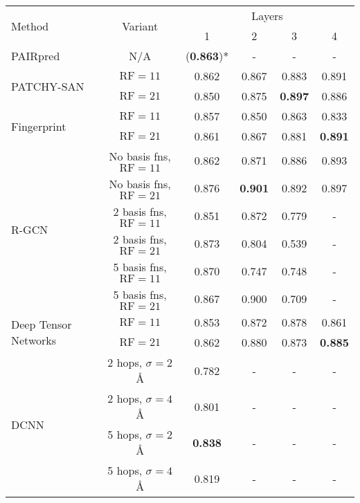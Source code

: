 \begin{table}
	\begin{center}
		\begin{tabular}{l c c c c c }
			\toprule
			
			\multirow{2}{*}{Method} & \multirow{2}{*}{Variant} &  \multicolumn{4}{c}{Layers} \\
											 & & 1 & 2 & 3 & 4 \\
			\midrule
			PAIRpred~\cite{minhas2014}   & N/A  & (\textbf{0.863})* & - & - & - \\

			\midrule
			\multirow{2}{*}{PATCHY-SAN~\cite{niepert2016}}  & $\text{RF}=11$ & 0.862 & 0.867 & 0.883 & 0.891 \\
										 & $\text{RF}=21$ & 0.850 & 0.875 & \textbf{0.897} & 0.886 \\
			\midrule
			\multirow{2}{*}{Fingerprint~\cite{duvenaud2015}}  & $\text{RF}=11$ & 0.857 & 0.850 & 0.863 & 0.833 \\
										  & $\text{RF}=21$ & 0.861 & 0.867 & 0.881 & \textbf{0.891} \\
			\midrule

			\multirow{6}{*}{R-GCN~\cite{schlichtkrull2017}} & No basis fns, $\text{RF}=11$ & 0.862 & 0.871 & 0.886 & 0.893 \\
								   & No basis fns, $\text{RF}=21$ & 0.876 & \textbf{0.901} & 0.892 & 0.897 \\
								   & 2 basis fns, $\text{RF}=11$ & 0.851 & 0.872 & 0.779 & -	   \\
								   & 2 basis fns, $\text{RF}=21$ & 0.873 & 0.804 & 0.539 & -     \\
								   & 5 basis fns, $\text{RF}=11$ & 0.870 & 0.747 & 0.748 & -	   \\
								   & 5 basis fns, $\text{RF}=21$ & 0.867 & 0.900 & 0.709 & -     \\
			\midrule
			\multirow{2}{*}{Deep Tensor Networks~\cite{schutt2017}}& $\text{RF}=11$ & 0.853 & 0.872 & 0.878 & 0.861 \\
			& $\text{RF}=21$ & 0.862 & 0.880 & 0.873 & \textbf{0.885} \\
			\midrule
			\multirow{4}{*}{DCNN~\cite{atwood2016}} & 2 hops, $\sigma=2$\AA{} & 0.782 & - & - & - \\
										& 2 hops, $\sigma=4$\AA{} & 0.801 & - & - & - \\
										& 5 hops, $\sigma=2$\AA{} & \textbf{0.838} & - & - & - \\ 
										& 5 hops, $\sigma=4$\AA{} & 0.819 & - & - & - \\ 
												  

\end{tabular}
\end{center}
\end{table}
